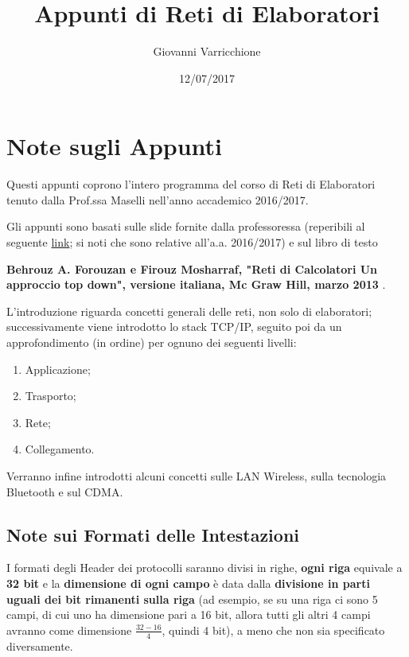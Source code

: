 \documentclass[a4paper]{article}
\begin{document}
\title{Appunti di Reti di Elaboratori}

\author{Giovanni Varricchione}

\date{12/07/2017}

\maketitle

\newpage

\tableofcontents

\clearpage

\section{Note sugli Appunti}
	
	Questi appunti coprono l'intero programma del corso di Reti di Elaboratori tenuto dalla Prof.ssa Maselli nell'anno accademico 2016/2017. 
	
	Gli appunti sono basati sulle slide fornite dalla professoressa (reperibili al seguente \href{http://twiki.di.uniroma1.it/twiki/view/Reti_elab/MZ/WebHome?rev=131}{link}; si noti che sono relative all'a.a. 2016/2017) e sul libro di testo 	
	
	\noindent
	 \textbf{Behrouz A. Forouzan e Firouz Mosharraf, "Reti di Calcolatori Un approccio top	down", versione italiana, Mc Graw Hill, marzo 2013}
	.\newline
	
	L’introduzione riguarda concetti generali delle reti, non solo di elaboratori; successivamente viene introdotto lo stack TCP/IP, seguito poi da un approfondimento (in ordine) per ognuno dei seguenti livelli:
	\begin{enumerate}
		\item Applicazione;
		\item Trasporto;
		\item Rete;
		\item Collegamento.
	\end{enumerate}
	Verranno infine introdotti alcuni concetti sulle LAN Wireless, sulla tecnologia Bluetooth e sul CDMA.
	
	
	\subsection{Note sui Formati delle Intestazioni}
		
		I formati degli Header dei protocolli saranno divisi in righe, \textbf{ogni riga} equivale a \textbf{32 bit} e la \textbf{dimensione di ogni campo} è data dalla \textbf{divisione in parti uguali dei bit rimanenti sulla riga} (ad esempio, se su una riga ci sono 5 campi, di cui uno ha dimensione pari a 16 bit, allora tutti gli altri 4 campi avranno come dimensione $ \frac{32-16}{4} $, quindi 4 bit), a meno che non sia specificato diversamente.	
	
\end{document}
